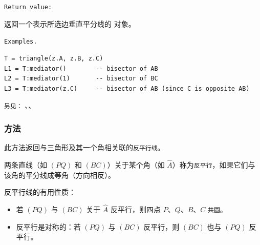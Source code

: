 \texttt{Return value: }

返回一个表示所选边垂直平分线的  对象。

\texttt{Examples.}

\begin{mybox}
\begin{verbatim}
T = triangle(z.A, z.B, z.C)
L1 = T:mediator()        -- bisector of AB
L2 = T:mediator(1)       -- bisector of BC
L3 = T:mediator(z.C)     -- bisector of AB (since C is opposite AB)
\end{verbatim}
\end{mybox}


\begin{tkzexample}[latex=.55\textwidth]
\begin{center}
\end{center}
\end{tkzexample}


\texttt{另见：} 、、

\subsubsection{方法 }
\label{antiparallel}

此方法返回与三角形及其一个角相关联的\texttt{反平行线}。

两条直线（如 $(PQ)$ 和 $(BC)$）关于某个角（如 $\hat{A}$）称为\texttt{反平行}，如果它们与该角的平分线成等角（方向相反）。


反平行线的有用性质：
\begin{itemize}
  \item 若 $(PQ)$ 与 $(BC)$ 关于 $\hat{A}$ 反平行，则四点 $P$、$Q$、$B$、$C$ \texttt{共圆}。
  \item 反平行是对称的：若 $(PQ)$ 与 $(BC)$ 反平行，则 $(BC)$ 也与 $(PQ)$ 反平行。
\end{itemize}

